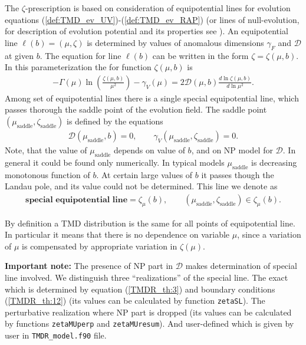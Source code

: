 \documentclass[prd,nofootinbib,eqsecnum,final]{revtex4}
\renewcommand{\(}{\left(}
\renewcommand{\)}{\right)}
\renewcommand{\[}{\left[}
\renewcommand{\]}{\right]}
\begin{document}
The $\zeta$-prescription is based on consideration of equipotential lines for evolution equations (\ref{def:TMD_ev_UV})-(\ref{def:TMD_ev_RAP}) (or lines of null-evolution, for description of evolution potential and its properties see \cite{Scimemi:2018xaf}). An equipotential line $\ell(b)=(\mu,\zeta)$ is determined by values of anomalous dimensions $\gamma_F$ and $\mathcal{D}$ at given $b$. The equation for line $\ell(b)$ can be written in the form $\zeta=\zeta(\mu,b)$. In this parameterization the for function $\zeta(\mu,b)$ is
\begin{eqnarray}\label{TMDR_th:3}
-\Gamma(\mu)\ln\(\frac{\zeta(\mu,b)}{\mu^2}\)-\gamma_V(\mu)=2\mathcal{D}(\mu,b)\frac{d\ln\zeta(\mu,b)}{d\ln\mu^2}.
\end{eqnarray}
Among set of equipotential lines there is a single special equipotential line, which passes thorough the saddle point of the evolution field. The saddle point $(\mu_{\text{saddle}},\zeta_{\text{saddle}})$ is defined by the equations
\begin{eqnarray}\label{TMDR_th:4}
\mathcal{D}(\mu_{\text{saddle}},b)=0,\qquad \gamma_V(\mu_{\text{saddle}},\zeta_{\text{saddle}})=0.
\end{eqnarray}
Note, that the value of $\mu_{\text{saddle}}$ depends on value of $b$, and on NP model for $\mathcal{D}$. In general it could be found only numerically. In typical models $\mu_{\text{saddle}}$ is decreasing monotonous function of $b$. At certain large values of $b$ it passes though the Landau pole, and its value could not be determined. This line we denote as
\begin{eqnarray}\label{TMDR_th:12}
\textbf{special equipotential line}=\zeta_\mu(b),\qquad (\mu_{\text{saddle}},\zeta_{\text{saddle}})\in \zeta_\mu(b).
\end{eqnarray}

By definition a TMD distribution is the same for all points of equipotential line. In particular it means that there is no dependence on variable $\mu$, since a variation of $\mu$ is compensated by appropriate variation in $\zeta(\mu)$. 

\textbf{Important note:} The presence of NP part in $\mathcal{D}$ makes determination of special line involved. We distinguish three ``realizations'' of the special line. The exact which is determined by equation (\ref{TMDR_th:3}) and boundary conditions (\ref{TMDR_th:12}) (its values can be calculated by function \texttt{zetaSL}). The perturbative realization where NP part is dropped (its values can be calculated by functions \texttt{zetaMUperp} and \texttt{zetaMUresum}). And user-defined which is given by user in \texttt{TMDR\_model.f90} file.
\end{document}
